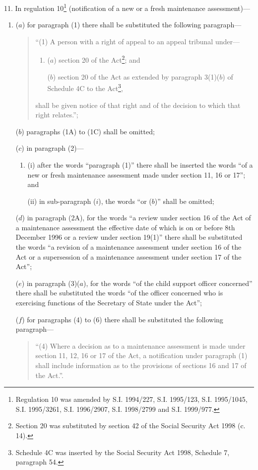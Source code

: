 \documentclass[12pt,a4paper]{article}
\begin{document}
11.  In regulation 10\footnote{\frenchspacing Regulation 10 was amended by S.I. 1994/227, S.I. 1995/123, S.I. 1995/1045, S.I. 1995/3261, S.I. 1996/2907, S.I. 1998/2799 and S.I. 1999/977.} (notification of a new or a fresh maintenance assessment)---
\begin{enumerate}\item[]
($a$) for paragraph (1) there shall be substituted the following paragraph—
\begin{quotation}
“(1) A person with a right of appeal to an appeal tribunal under---
\begin{enumerate}\item[]
($a$) section 20 of the Act\footnote{\frenchspacing Section 20 was substituted by section 42 of the Social Security Act 1998 (c. 14).}; and

($b$) section 20 of the Act as extended by paragraph 3(1)($b$) of Schedule 4C to the Act\footnote{\frenchspacing Schedule 4C was inserted by the Social Security Act 1998, Schedule 7, paragraph 54.},
\end{enumerate}
shall be given notice of that right and of the decision to which that right relates.”;
\end{quotation}

($b$) paragraphs (1A) to (1C) shall be omitted;

($c$) in paragraph (2)---
\begin{enumerate}\item[]
(i) after the words “paragraph (1)” there shall be inserted the words “of a new or fresh maintenance assessment made under section 11, 16 or 17”; and

(ii) in sub-paragraph ($i$), the words “or ($b$)” shall be omitted;
\end{enumerate}

($d$) in paragraph (2A), for the words “a review under section 16 of the Act of a maintenance assessment the effective date of which is on or before 8th December 1996 or a review under section 19(1)” there shall be substituted the words “a revision of a maintenance assessment under section 16 of the Act or a supersession of a maintenance assessment under section 17 of the Act”;

($e$) in paragraph (3)($a$), for the words “of the child support officer concerned” there shall be substituted the words “of the officer concerned who is exercising functions of the Secretary of State under the Act”;

($f$) for paragraphs (4) to (6) there shall be substituted the following paragraph---
\begin{quotation}
“(4) Where a decision as to a maintenance assessment is made under section 11, 12, 16 or 17 of the Act, a notification under paragraph (1) shall include information as to the provisions of sections 16 and 17 of the Act.”.
\end{quotation}
\end{enumerate}
\end{document}
